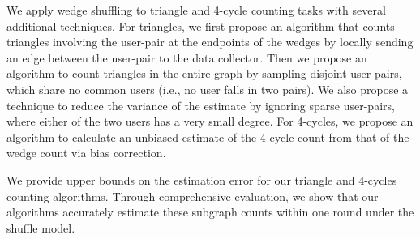 We apply wedge shuffling to triangle and 4-cycle counting tasks with several additional techniques. 
For triangles, we first 
propose an algorithm that counts triangles involving the user-pair at the endpoints of the wedges by locally sending an edge between the user-pair to the data collector. 
Then we propose an algorithm to count triangles in the entire graph by sampling disjoint user-pairs, which share no common users (i.e., 
no user falls in two pairs). 
We also propose a technique to reduce the variance of the estimate by ignoring sparse user-pairs, where either of the two users has a very small degree. 
For 4-cycles, we propose an algorithm to calculate an unbiased estimate of the 4-cycle count from that of the wedge count via bias correction. 

We provide upper bounds on the estimation error for our triangle and 4-cycles counting algorithms. 
Through comprehensive evaluation, we show that 
our algorithms 
accurately estimate these subgraph counts within one round under the shuffle model. 



